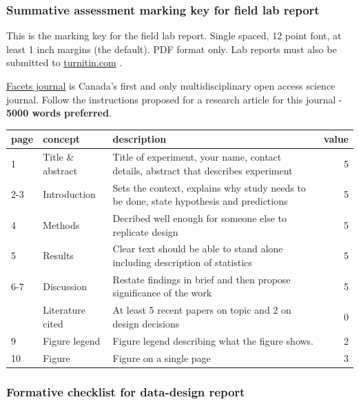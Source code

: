 \documentclass[
]{book}
\begin{document}
\hypertarget{summative-assessment-marking-key-for-field-lab-report}{%
\subsubsection*{Summative assessment marking key for field lab report}\label{summative-assessment-marking-key-for-field-lab-report}}

This is the marking key for the field lab report. Single spaced, 12 point font, at least 1 inch margins (the default). PDF format only. Lab reports must also be submitted to \href{https://www.turnitin.com}{turnitin.com} .

\href{https://www.facetsjournal.com/authors/instructions/}{Facets journal} is Canada's first and only multidisciplinary open access science journal. Follow the instructions proposed for a research article for this journal - \textbf{5000 words preferred}.

\begin{tabular}{lllr}
\toprule
page & concept & description & value\\
\midrule
1 & Title \& abstract & Title of experiment, your name, contact details, abstract that describes experiment & 5\\
2-3 & Introduction & Sets the context, explains why study needs to be done, state hypothesis and predictions & 5\\
4 & Methods & Decribed well enough for someone else to replicate design & 5\\
5 & Results & Clear text should be able to stand alone including description of statistics & 5\\
6-7 & Discussion & Restate findings in brief and then propose significance of the work & 5\\
\addlinespace
8 & Literature cited & At least 5 recent papers on topic and 2 on design decisions & 0\\
9 & Figure legend & Figure legend describing what the figure shows. & 2\\
10 & Figure & Figure on a single page & 3\\
\bottomrule
\end{tabular}

\hypertarget{formative-checklist-for-data-design-report}{%
\subsubsection*{Formative checklist for data-design report}\label{formative-checklist-for-data-design-report}}
\end{document}
